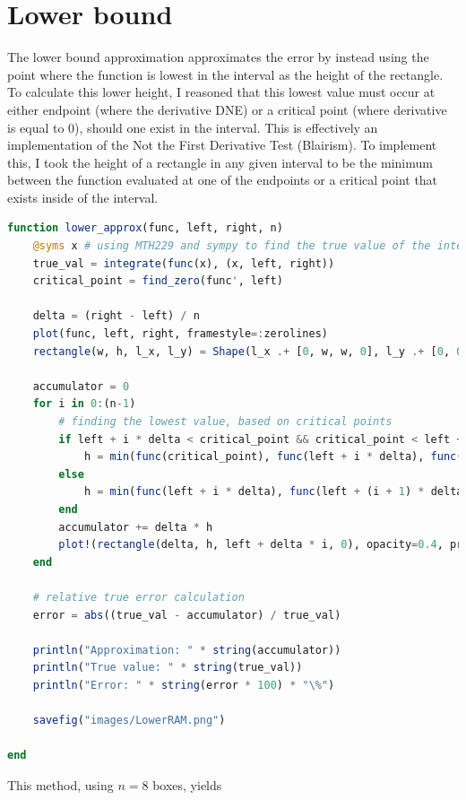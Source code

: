 \documentclass[12pt]{article}
\begin{document}
\section{Lower bound}
    The lower bound approximation approximates the error by instead using the point where the function is lowest in the interval as the height of the rectangle. 
    To calculate this lower height, I reasoned that this lowest value must occur at either endpoint (where the derivative DNE) or a critical point (where derivative is equal to 0), should one exist in the interval.
    This is effectively an implementation of the Not the First Derivative Test (Blairism). To implement this, I took the height of a rectangle in any given interval 
    to be the minimum between the function evaluated at one of the endpoints or a critical point that exists inside of the interval.
    \begin{lstlisting}[language=julia]
function lower_approx(func, left, right, n)
    @syms x # using MTH229 and sympy to find the true value of the integral
    true_val = integrate(func(x), (x, left, right))
    critical_point = find_zero(func', left)

    delta = (right - left) / n
    plot(func, left, right, framestyle=:zerolines)
    rectangle(w, h, l_x, l_y) = Shape(l_x .+ [0, w, w, 0], l_y .+ [0, 0, h, h])

    accumulator = 0
    for i in 0:(n-1)
        # finding the lowest value, based on critical points
        if left + i * delta < critical_point && critical_point < left + (i+1) * delta
            h = min(func(critical_point), func(left + i * delta), func(left + (i+1) * delta))
        else 
            h = min(func(left + i * delta), func(left + (i + 1) * delta))
        end
        accumulator += delta * h
        plot!(rectangle(delta, h, left + delta * i, 0), opacity=0.4, primary=false)
    end

    # relative true error calculation
    error = abs((true_val - accumulator) / true_val)

    println("Approximation: " * string(accumulator))
    println("True value: " * string(true_val))
    println("Error: " * string(error * 100) * "\%")

    savefig("images/LowerRAM.png")

end
    \end{lstlisting}
    This method, using $n=8$ boxes, yields 
\end{document}

